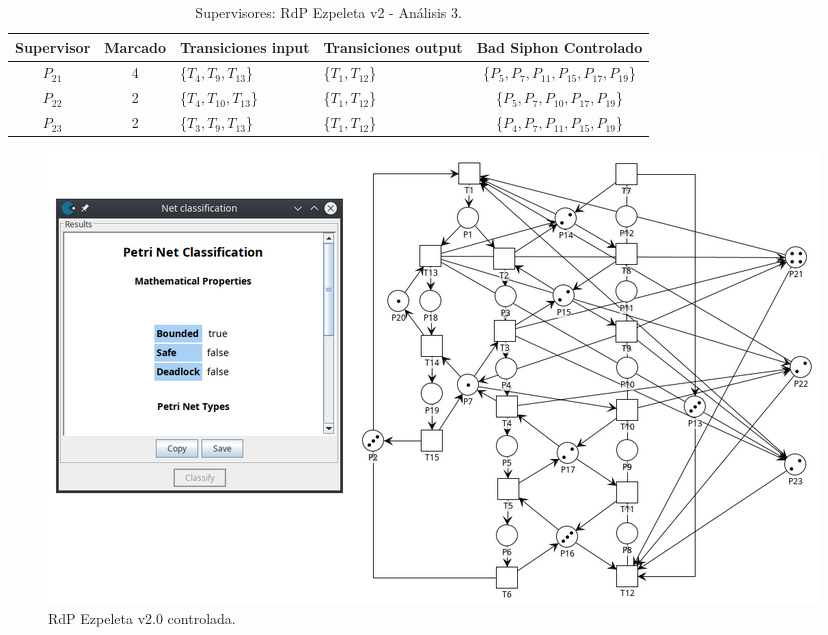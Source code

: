 \begin{table}[H]
    \centering
    \begin{tabular}{|c|c|P{2.2cm}|P{2.2cm}|c|}
    \hline
    \textbf{Supervisor} & \textbf{Marcado} & \textbf{Transiciones input} & \textbf{Transiciones output} & \textbf{Bad Siphon Controlado}  \\  \hline
    $P_{21}$ & 4 & \{$T_{4}, T_{9}, T_{13}$\} & \{$T_{1}, T_{12}$\} & \{$P_5, P_{7}, P_{11}, P_{15}, P_{17}, P_{19}$\} \\ 
    \hline
    $P_{22}$ & 2 & \{$T_{4}, T_{10}, T_{13}$\} & \{$T_{1}, T_{12}$\} & \{$P_{5},P_{7},P_{10},P_{17}, P_{19}$\} \\ 
    \hline
    $P_{23}$ & 2 & \{$T_{3}, T_{9}, T_{13}$\} & \{$T_{1}, T_{12}$\} & \{$P_{4},P_{7},P_{11},P_{15}, P_{19}$\} \\ 
    \hline
    \end{tabular}
    \caption{Supervisores: RdP Ezpeleta v2 - Análisis 3.}
    \label{tab:Ezpeletav23-v4}
\end{table}


\begin{figure}[H]
	\centering
	\includegraphics[width=\textwidth]{Figures/algoritmo4/ezpeleta_v2_imag3.png}
	\caption{RdP Ezpeleta v2.0 controlada.}
	\label{fig:Rdp-Ezpeletav2-Contv4}
\end{figure}
\bigskip

